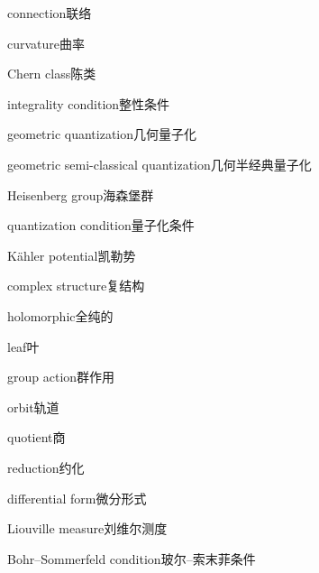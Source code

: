 \begin{multicols}{2}
connection\hspace{0.9em}联络\par
curvature\hspace{0.9em}曲率\par
Chern class\hspace{0.9em}陈类\par
integrality condition\hspace{0.9em}整性条件\par
geometric quantization\hspace{0.9em}几何量子化\par
geometric semi-classical quantization\hspace{0.9em}几何半经典量子化\par
Heisenberg group\hspace{0.9em}海森堡群\par
quantization condition\hspace{0.9em}量子化条件\par
Kähler potential\hspace{0.9em}凯勒势\par
complex structure\hspace{0.9em}复结构\par
holomorphic\hspace{0.9em}全纯的\par
leaf\hspace{0.9em}叶\par
group action\hspace{0.9em}群作用\par
orbit\hspace{0.9em}轨道\par
quotient\hspace{0.9em}商\par
reduction\hspace{0.9em}约化\par
differential form\hspace{0.9em}微分形式\par
Liouville measure\hspace{0.9em}刘维尔测度\par
Bohr–Sommerfeld condition\hspace{0.9em}玻尔–索末菲条件\par
\end{multicols}

